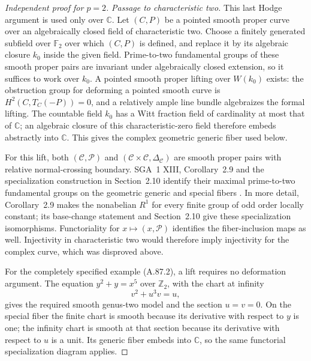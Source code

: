 \documentclass[11pt]{article}
\begin{document}
\begin{proof}[Independent proof for \(p=2\)]
\emph{Passage to characteristic two.}
This last Hodge argument is used only over \(\mathbb C\).
Let \((C,P)\) be a pointed smooth proper curve over an
algebraically closed field of characteristic two. Choose a
finitely generated subfield over \(\mathbb F_2\) over which
\((C,P)\) is defined, and replace it by its algebraic closure
\(k_0\) inside the given field. Prime-to-two fundamental groups
of these smooth proper pairs are invariant under algebraically
closed extension, so it suffices to work over \(k_0\).
A pointed smooth proper lifting over \(W(k_0)\) exists: the
obstruction group for deforming a pointed smooth curve is
\(H^2(C,T_C(-P))=0\), and a relatively ample line bundle
algebraizes the formal lifting. The countable field \(k_0\)
has a Witt fraction field of cardinality at most that of
\(\mathbb C\); an algebraic closure of this characteristic-zero
field therefore embeds abstractly into \(\mathbb C\). This
gives the complex geometric generic fiber used below.

For this lift, both
\((\mathcal C,\mathcal P)\) and
\((\mathcal C\times\mathcal C,\Delta_{\mathcal C})\)
are smooth proper pairs with relative normal-crossing boundary.
SGA~1 XIII, Corollary~2.9 and the specialization construction in
Section~2.10 identify their maximal prime-to-two fundamental
groups on the geometric generic and special fibers
\cite{AR_SGA1}. In more detail, Corollary~2.9 makes the nonabelian
\(R^1\) for every finite group of odd order locally constant;
its base-change statement and Section~2.10 give these
specialization isomorphisms. Functoriality for
\(x\mapsto(x,\mathcal P)\) identifies the fiber-inclusion maps
as well. Injectivity in characteristic two would therefore imply
injectivity for the complex curve, which was disproved above.

For the completely specified example (A.87.2), a lift requires
no deformation argument. The equation \(y^2+y=x^5\) over
\(\mathbb Z_2\), with the chart at infinity
\[
                         v^2+u^3v=u,
\]
gives the required smooth genus-two model and the section
\(u=v=0\). On the special fiber the finite chart is smooth
because its derivative with respect to \(y\) is one; the
infinity chart is smooth at that section because its derivative
with respect to \(u\) is a unit. Its generic fiber embeds into
\(\mathbb C\), so the same functorial specialization diagram
applies.
\end{proof}
\end{document}
